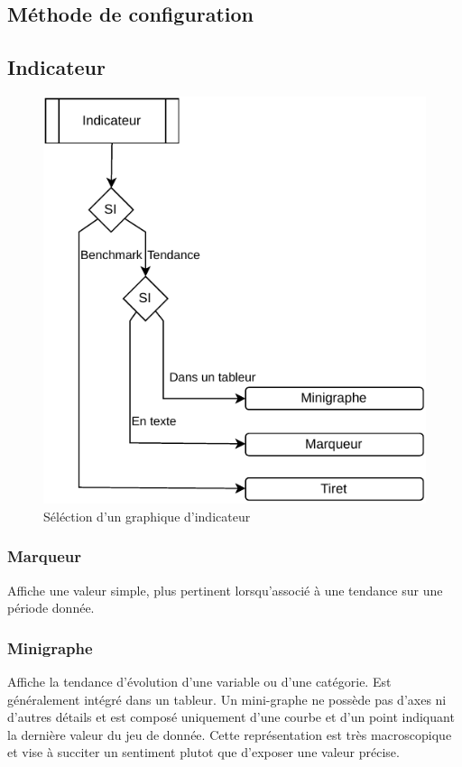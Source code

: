 \documentclass[a4paper,12pt]{article}
\begin{document}
\begin{multicols}{2}
\section*{Méthode de configuration}
\label{sec:orgab55b4b}
\subsection*{Indicateur}
\label{sec:org00930a3}

\begin{figure}[H]
\centering
\includegraphics[width=.9\linewidth]{./img/select-indicateur.pdf}
\caption{\label{fig:org37a1d85}Séléction d'un graphique d'indicateur}
\end{figure}
\subsubsection*{Marqueur}
\label{sec:org1b0dd98}
Affiche une valeur simple, plus pertinent lorsqu'associé à une tendance sur une période donnée. \autocite{mikeyiHowChooseRight2020}
\subsubsection*{Minigraphe}
\label{sec:org19c8386}
Affiche la tendance d'évolution d'une variable ou d'une catégorie. Est généralement intégré dans un tableur. Un mini-graphe ne possède pas d'axes ni d'autres détails et est composé uniquement d'une courbe et d'un point indiquant la dernière valeur du jeu de donnée. \autocite{sosulskiGraphics2019} Cette représentation est très macroscopique et vise à succiter un sentiment plutot que d'exposer une valeur précise. \autocite{jonathanschwabishDistribution2021}


\end{multicols}
\end{document}
